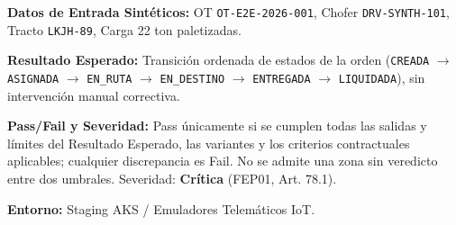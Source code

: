 \par\noindent\textbf{Datos de Entrada Sintéticos:} OT \texttt{O\allowbreak{}T\allowbreak{}-\allowbreak{}E\allowbreak{}2\allowbreak{}E\allowbreak{}-\allowbreak{}2\allowbreak{}0\allowbreak{}2\allowbreak{}6\allowbreak{}-\allowbreak{}0\allowbreak{}0\allowbreak{}1\allowbreak{}}, Chofer \texttt{D\allowbreak{}R\allowbreak{}V\allowbreak{}-\allowbreak{}S\allowbreak{}Y\allowbreak{}N\allowbreak{}T\allowbreak{}H\allowbreak{}-\allowbreak{}1\allowbreak{}0\allowbreak{}1\allowbreak{}}, Tracto \texttt{L\allowbreak{}K\allowbreak{}J\allowbreak{}H\allowbreak{}-\allowbreak{}8\allowbreak{}9\allowbreak{}}, Carga 22 ton paletizadas.\par
\par\noindent\textbf{Resultado Esperado:} Transición ordenada de estados de la orden (\texttt{C\allowbreak{}R\allowbreak{}E\allowbreak{}A\allowbreak{}D\allowbreak{}A\allowbreak{}} \(\rightarrow\) \texttt{A\allowbreak{}S\allowbreak{}I\allowbreak{}G\allowbreak{}N\allowbreak{}A\allowbreak{}D\allowbreak{}A\allowbreak{}} \(\rightarrow\) \texttt{E\allowbreak{}N\allowbreak{}\_\allowbreak{}R\allowbreak{}U\allowbreak{}T\allowbreak{}A\allowbreak{}} \(\rightarrow\) \texttt{E\allowbreak{}N\allowbreak{}\_\allowbreak{}D\allowbreak{}E\allowbreak{}S\allowbreak{}T\allowbreak{}I\allowbreak{}N\allowbreak{}O\allowbreak{}} \(\rightarrow\) \texttt{E\allowbreak{}N\allowbreak{}T\allowbreak{}R\allowbreak{}E\allowbreak{}G\allowbreak{}A\allowbreak{}D\allowbreak{}A\allowbreak{}} \(\rightarrow\) \texttt{L\allowbreak{}I\allowbreak{}Q\allowbreak{}U\allowbreak{}I\allowbreak{}D\allowbreak{}A\allowbreak{}D\allowbreak{}A\allowbreak{}}), sin intervención manual correctiva.\par
\par\noindent\textbf{Pass/Fail y Severidad:} Pass únicamente si se cumplen todas las salidas y límites del Resultado Esperado, las variantes y los criterios contractuales aplicables; cualquier discrepancia es Fail. No se admite una zona sin veredicto entre dos umbrales. Severidad: \textbf{Crítica} (FEP01, Art. 78.1).\par
\par\noindent\textbf{Entorno:} Staging AKS / Emuladores Telemáticos IoT.\par







